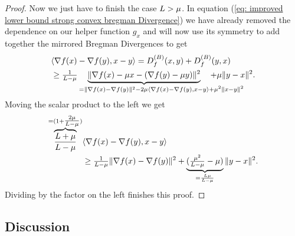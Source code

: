 \begin{proof}
	Now we just have to finish the case \(L>\mu\). In equation
	(\ref{eq: improved lower bound strong convex bregman Divergence}) we have
	already removed the dependence on our helper function \(g_x\) and will now
	use its symmetry to add together the mirrored Bregman Divergences to get
	\begin{align*}
		&\langle \nabla f(x) - \nabla f(y), x-y\rangle
		= \bregmanDiv{f}(x,y) + \bregmanDiv{f}(y,x) \\
		&\ge \tfrac{1}{\ubound-\lbound}
		\underbrace{\|\nabla f(x) - \lbound x - (\nabla f(y)-\lbound y)\|^2}_{
			=\|\nabla f(x) - \nabla f(y)\|^2
			- 2\lbound \langle \nabla f(x) - \nabla f(y), x-y\rangle
			\mathrlap{+ \lbound^2 \| x-y\|^2}
		}
		+ \lbound \|y-x\|^2.
	\end{align*}
	Moving the scalar product to the left we get
	\begin{align*}
		\overbrace{\frac{ L+\mu }{ L-\mu }}^{
			= (1+\tfrac{2\mu}{L-\mu})
		}
		&\langle \nabla f(x) - \nabla f(y), x-y\rangle \\
		&\ge \tfrac{1}{L-\mu}\|\nabla f(x) - \nabla f(y)\|^2
		+ \underbrace{(\tfrac{\mu^2}{L-\mu}-\mu)}_{
			=\frac{L\mu}{ L-\mu }
		} \|y-x\|^2.
	\end{align*}
	Dividing by the factor on the left finishes this proof.
 \end{proof}

\subsection{Discussion}

